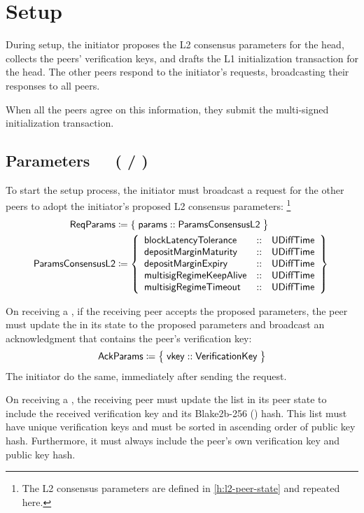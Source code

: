 \documentclass[../hydrozoa.tex]{subfiles}
\begin{document}
\section{Setup}%
\label{h:l2-consensus-setup}%

During setup, the initiator proposes the L2 consensus parameters for the head, collects the peers' verification keys, and drafts the L1 initialization transaction for the head.
The other peers respond to the initiator's requests, broadcasting their responses to all peers.

When all the peers agree on this information, they submit the multi-signed initialization transaction.

\subsection{Parameters~~~( / )}%
\label{h:l2-consensus-parameters}%

To start the setup process, the initiator must broadcast a request for the other peers to adopt the initiator's proposed L2 consensus parameters:%
\footnote{The L2 consensus parameters are defined in \cref{h:l2-peer-state} and repeated here.}
\begin{equation*}
\begin{split}
  \T{ReqParams} &\coloneq \{\; \T{params} :: \paramsConsensusTypeName{} \;\bigr\} \\
  \paramsConsensusTypeName{} &\coloneq \paramsConsensusTypeBody{}
\end{split}
\end{equation*}

On receiving a , if the receiving peer accepts the proposed parameters, the peer must update the  in its state to the proposed parameters and broadcast an acknowledgment that contains the peer's verification key:
\begin{equation*}
  \mathsf{AckParams} \coloneq \;\bigr\{\; \mathsf{vkey} :: \mathsf{VerificationKey} \;\bigr\}
\end{equation*}
The initiator do the same, immediately after sending the  request.

On receiving a , the receiving peer must update the  list in its peer state to include the received verification key and its Blake2b-256 () hash.
This list must have unique verification keys and must be sorted in ascending order of public key hash.
Furthermore, it must always include the peer's own verification key and public key hash.
\end{document}
